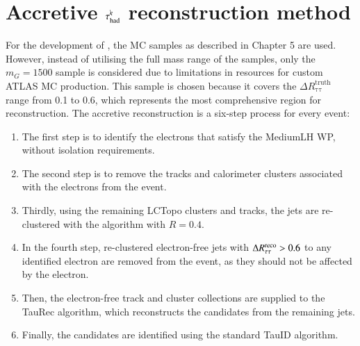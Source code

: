\section{Accretive $\tau_\mathrm{had}^{e\mkern-9mu\backslash}$ reconstruction method}
    \label{sec:erm:method}
    For the development of \tauhaderm, the \GHHFourtau MC samples as described in Chapter 5 are used. 
    However, instead of utilising the full mass range of the \GHHFourtau 
    samples, only the $m_G=1500$ \GeV sample is considered due to limitations in resources for 
    custom ATLAS MC production.
    This sample is chosen because it covers the $\Delta R^\mathrm{truth}_\mathrm{\tau\tau}$ 
    range from 0.1 to 0.6, which represents the most comprehensive region for \tauhaderm reconstruction.
    The accretive \tauhaderm reconstruction is a six-step process for every event:
    \begin{enumerate}
        \item The first step is to identify the electrons that satisfy the MediumLH WP, without isolation requirements.
        \item The second step is to remove the tracks and calorimeter clusters associated with the electrons from the event.
        \item Thirdly, using the remaining LCTopo clusters and tracks, the \tauseed jets are re-clustered with the \antikt algorithm with $R=0.4$.
        \item In the fourth step, re-clustered electron-free \tauseed jets with $\Delta R_\mathrm{\tau\tau}^\mathrm{reco} > 0.6$ to any identified electron are removed from the event, as they should not be affected by the electron.
        \item Then, the electron-free track and cluster collections are supplied to the TauRec algorithm, which reconstructs the \tauhaderm candidates from the remaining \tauseed jets.
        \item Finally, the \tauhaderm candidates are identified using the standard TauID algorithm.
    \end{enumerate}

